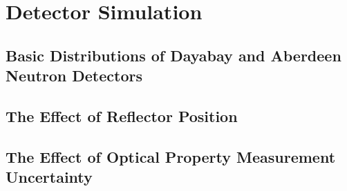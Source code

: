 \chapter {Detector Simulation}

\section {Basic Distributions of Dayabay and Aberdeen Neutron Detectors}

\section {The Effect of Reflector Position}

\section {The Effect of Optical Property Measurement Uncertainty}
